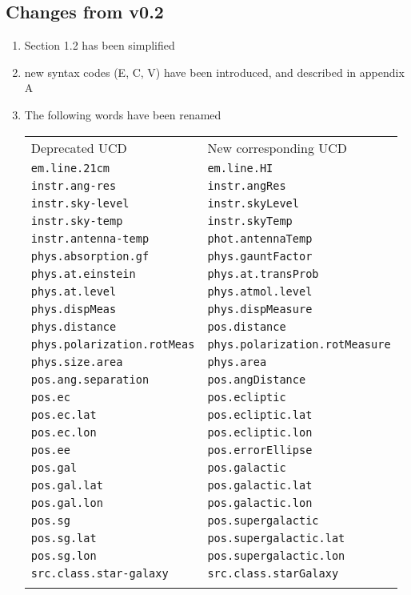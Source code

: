 \documentclass[11pt,a4paper]{ivoa}
\begin{document}
\subsection{Changes from v0.2}
\begin{enumerate}
\item Section 1.2 has been simplified
\item new syntax codes (E, C, V) have been introduced, and described in appendix A
\item The following words have been renamed

\begin{longtable}{|l|l|}
\sptablerule
Deprecated UCD & New corresponding UCD\\
\sptablerule
{\tt em.line.21cm} & {\tt em.line.HI}\\
{\tt instr.ang-res} & {\tt instr.angRes}\\
{\tt instr.sky-level} & {\tt instr.skyLevel}\\
{\tt instr.sky-temp} & {\tt instr.skyTemp}\\
{\tt instr.antenna-temp} & {\tt phot.antennaTemp}\\
{\tt phys.absorption.gf} & {\tt phys.gauntFactor}\\
{\tt phys.at.einstein} & {\tt phys.at.transProb}\\
{\tt phys.at.level} & {\tt phys.atmol.level}\\
{\tt phys.dispMeas} & {\tt phys.dispMeasure}\\ 
{\tt phys.distance} & {\tt pos.distance}\\
{\tt phys.polarization.rotMeas} & {\tt phys.polarization.rotMeasure}\\
{\tt phys.size.area} & {\tt phys.area}\\
{\tt pos.ang.separation} & {\tt pos.angDistance}\\ 
{\tt pos.ec} & {\tt pos.ecliptic}\\
{\tt pos.ec.lat} & {\tt pos.ecliptic.lat}\\
{\tt pos.ec.lon} & {\tt pos.ecliptic.lon}\\
{\tt pos.ee} & {\tt pos.errorEllipse}\\ 
{\tt pos.gal} & {\tt pos.galactic}\\
{\tt pos.gal.lat} & {\tt pos.galactic.lat}\\
{\tt pos.gal.lon} & {\tt pos.galactic.lon}\\
{\tt pos.sg} & {\tt pos.supergalactic}\\
{\tt pos.sg.lat} & {\tt pos.supergalactic.lat}\\
{\tt pos.sg.lon} & {\tt pos.supergalactic.lon}\\
{\tt src.class.star-galaxy} & {\tt src.class.starGalaxy}\\
\sptablerule
\end{longtable}


\end{enumerate}
\end{document}

